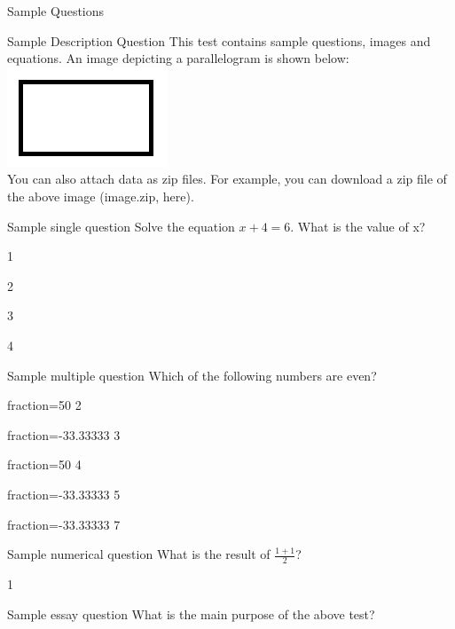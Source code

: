 \documentclass[12pt]{article}
\begin{document}
\begin{quiz}{Sample Questions}

\begin{desc}{Sample Description Question}
This test contains sample questions, images and equations. An image depicting a parallelogram is shown below:\\
\includegraphics{image.png}\\
You can also attach data as zip files. For example, you can download a zip file of the above image ({{image.zip, here}}).
\end{desc}

\begin{multi}{Sample single question}
Solve the equation ${x + 4 = 6}$. What is the value of x?
\item 1
\item* 2
\item 3
\item 4
\end{multi}

\begin{multi}[multiple]{Sample multiple question}
Which of the following numbers are even?
\item[fraction=50] 2
\item[fraction=-33.33333] 3
\item[fraction=50] 4
\item[fraction=-33.33333] 5
\item[fraction=-33.33333] 7
\end{multi}

\begin{numerical}{Sample numerical question}
What is the result of ${\frac{1 + 1}{2}}$?
\item 1
\end{numerical}

\begin{essay}{Sample essay question}
What is the main purpose of the above test?
\end{essay}

\end{quiz}
\end{document}
